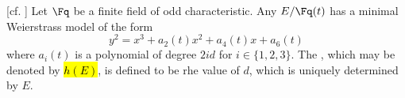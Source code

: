 \begin{definition} \label{definition:height_of_an_elliptic_curve_over_a_global_function_field_of_odd_characteristic}[cf. {\cite[1.2.1]{feng_landesman_rains_gdsgecff}}]
    Let $\Fq$ be a finite field of odd characteristic. Any  $E/\Fq(t)$ has a minimal Weierstrass model of the form
    $$y^2 = x^3 + a_2(t) x^2+ a_4(t) x + a_6(t)$$
    where $a_i(t)$ is a polynomial of degree $2id$ for $i \in \{1,2,3\}$. The , which may be denoted by \hl{$h(E)$}, is defined to be rhe value of $d$, which is uniquely determined by $E$.
\end{definition}